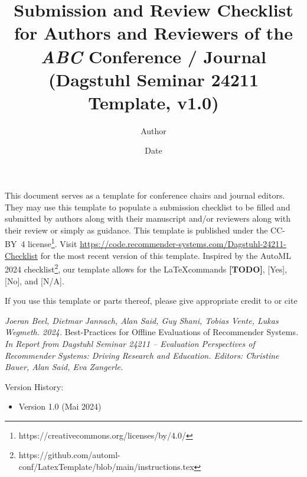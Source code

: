\documentclass{article}
\title{Submission and Review Checklist for Authors and Reviewers of the \textit{ABC} Conference / Journal \\
(Dagstuhl Seminar 24211 Template, v1.0)}
\author{Author}
\date{Date}
\begin{document}

\newcommand{\answerYes}[1]{{\textcolor{answerYesColor}{[Yes]}\xspace#1}}
\newcommand{\answerNo}[1]{{\textcolor{answerNoColor}{[No]}\xspace#1}}
\newcommand{\answerNA}[1]{{\textcolor{answerNAColor}{[N/A]}\xspace#1}}
\newcommand{\answerTODO}{\textcolor{answerTODOColor}{\textbf{[TODO]}}}


\maketitle

\noindent This document serves as a template for conference chairs and journal editors. They may use this template to populate a submission checklist to be filled and submitted by authors along with their manuscript and/or reviewers along with their review or simply as guidance. This template is published under the CC-BY~4 license\footnote{https://creativecommons.org/licenses/by/4.0/}. Visit 
 \href{https://code.recommender-systems.com/Dagstuhl-24211-Checklist}{https://code.recommender-systems.com/Dagstuhl-24211-Checklist} for the most recent version of this template. Inspired by the AutoML 2024 checklist\footnote{https://github.com/automl-conf/LatexTemplate/blob/main/instructions.tex}, our template allows for the \LaTeX\space commands \answerTODO, \answerYes{}, \answerNo{}, and \answerNA{}.

If you use this template or parts thereof, please give appropriate credit to or cite

\begin{displayquote}
\textit{Joeran Beel, Dietmar Jannach, Alan Said, Guy Shani, Tobias Vente, Lukas Wegmeth. 2024. }Best-Practices for Offline Evaluations of Recommender Systems\textit{. In Report from Dagstuhl Seminar 24211 -- Evaluation Perspectives of Recommender Systems: Driving Research and Education. Editors: Christine Bauer, Alan Said, Eva Zangerle.}
\end{displayquote}
Version History:
\begin{itemize}
    \item Version 1.0 (Mai 2024)
\end{itemize}


\end{document}
